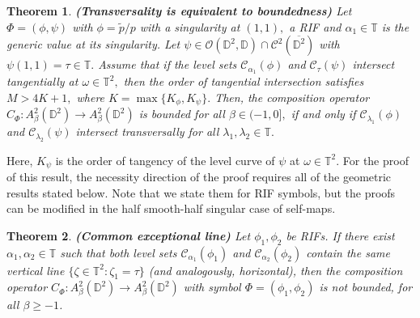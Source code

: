 \documentclass[12pt]{amsart}
\newtheorem{theorem}{Theorem}[section]
\numberwithin{equation}{section}
\begin{document}
\begin{theorem}\label{characterization1}\textbf{(Transversality is equivalent to boundedness)} Let $\Phi=(\phi,\psi)$ with $\phi=\widetilde{p}/p$ with a singularity at $(1,1),$ a RIF and $\alpha_1\in\mathbb{T}$ is the generic value at its singularity. Let $\psi\in\mathcal{O}(\mathbb{D}^2,\mathbb{D})\cap \mathcal{C}^2(\overline{\mathbb{D}^2})$ with $\psi(1,1)=\tau\in\mathbb{T}.$ Assume that if the level sets $\mathcal{C}_{\alpha_1}(\phi)$ and $\mathcal{C}_{\tau}(\psi)$ intersect tangentially at $\omega\in\mathbb{T}^2,$ then the order of tangential intersection satisfies $M>4K+1,$ where $K=\max\{K_{\phi},K_{\psi}\}.$  Then, the composition operator $C_{\Phi}:A^2_{\beta}(\mathbb{D}^2)\to A^2_{\beta}(\mathbb{D}^2)$ is bounded for all $\beta\in(-1,0],$ if and only if $\mathcal{C}_{\lambda_1}(\phi)$ and $\mathcal{C}_{\lambda_2}(\psi)$ intersect transversally for all $\lambda_1,\lambda_2\in \mathbb{T}.$
\end{theorem}
Here, $K_{\psi}$ is the order of tangency of the level curve of $\psi$ at $\omega\in\mathbb{T}^2.$
For the proof of this result, the necessity direction of the proof requires all of the geometric results stated below. Note that we state them for RIF symbols, but the proofs can be modified in the half smooth-half singular case of self-maps. 
\begin{theorem}\label{exceptionalline}\textbf{(Common exceptional line)} Let $\phi_1,\phi_2$ be RIFs. If there exist $\alpha_1,\alpha_2\in\mathbb{T}$ such that both level sets $\mathcal{C}_{\alpha_1}(\phi_1)$ and $\mathcal{C}_{\alpha_2}(\phi_2)$ contain the same vertical line $\{\zeta\in \mathbb{T}^2:\zeta_1=\tau\}$ (and analogously, horizontal), then the composition operator $C_{\Phi}:A^2_{\beta}(\mathbb{D}^2)\to A^2_{\beta}(\mathbb{D}^2)$ with symbol $\Phi=(\phi_1,\phi_2)$ is not bounded, for all $\beta\ge-1$.
\end{theorem}  
\end{document}
